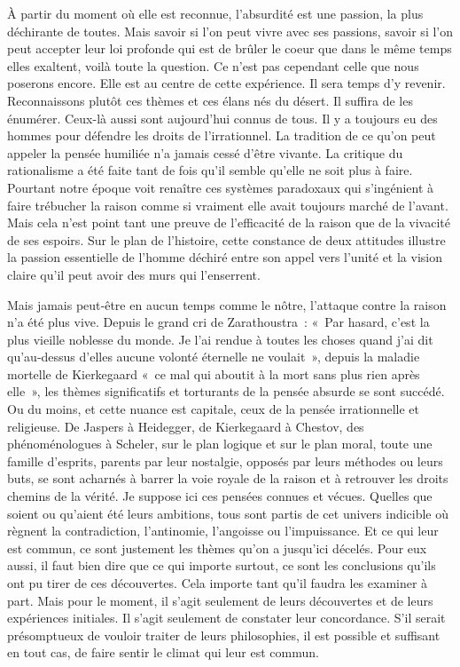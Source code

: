 \documentclass{book}
\begin{document}
À partir du moment où elle est reconnue, l'absurdité est une passion, la plus déchirante de toutes. Mais savoir si l'on peut vivre avec ses passions, savoir si l'on peut accepter leur loi profonde qui est de brûler le coeur que dans le même temps elles exaltent, voilà toute la question. Ce n'est pas cependant celle que nous poserons encore. Elle est au centre de cette expérience. Il sera temps d'y revenir. Reconnaissons plutôt ces thèmes et ces élans nés du désert. Il suffira de les énumérer. Ceux-là aussi sont aujourd'hui connus de tous. Il y a toujours eu des hommes pour défendre les droits de l'irrationnel. La tradition de ce qu'on peut appeler la pensée humiliée n'a jamais cessé d'être vivante. La critique du rationalisme a été faite tant de fois qu'il semble qu'elle ne soit plus à faire. Pourtant notre époque voit renaître ces systèmes paradoxaux qui s'ingénient à faire trébucher la raison comme si vraiment elle avait toujours marché de l'avant. Mais cela n'est point tant une preuve de l'efficacité de la raison que de la vivacité de ses espoirs. Sur le plan de l'histoire, cette constance de deux attitudes illustre la passion essentielle de l'homme déchiré entre son appel vers l'unité et la vision claire qu'il peut avoir des murs qui l'enserrent.

Mais jamais peut‑être en aucun temps comme le nôtre, l'attaque contre la raison n'a été plus vive. Depuis le grand cri de Zarathoustra : « Par hasard, c'est la plus vieille noblesse du monde. Je l'ai rendue à toutes les choses quand j'ai dit qu'au‑dessus d'elles aucune volonté éternelle ne voulait », depuis la maladie mortelle de Kierkegaard « ce mal qui aboutit à la mort sans plus rien après elle », les thèmes significatifs et torturants de la pensée absurde se sont succédé. Ou du moins, et cette nuance est capitale, ceux de la pensée irrationnelle et religieuse. De Jaspers à Heidegger, de Kierkegaard à Chestov, des phénoménologues à Scheler, sur le plan logique et sur le plan moral, toute une famille d'esprits, parents par leur nostalgie, opposés par leurs méthodes ou leurs buts, se sont acharnés à barrer la voie royale de la raison et à retrouver les droits chemins de la vérité. Je suppose ici ces pensées connues et vécues. Quelles que soient ou qu'aient été leurs ambitions, tous sont partis de cet univers indicible où règnent la contradiction, l'antinomie, l'angoisse ou l'impuissance. Et ce qui leur est commun, ce sont justement les thèmes qu'on a jusqu'ici décelés. Pour eux aussi, il faut bien dire que ce qui importe surtout, ce sont les conclusions qu'ils ont pu tirer de ces découvertes. Cela importe tant qu'il faudra les examiner à part. Mais pour le moment, il s'agit seulement de leurs découvertes et de leurs expériences initiales. Il s'agit seulement de constater leur concordance. S'il serait présomptueux de vouloir traiter de leurs philosophies, il est possible et suffisant en tout cas, de faire sentir le climat qui leur est commun.
\end{document}
